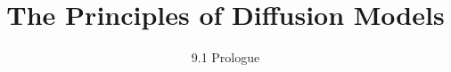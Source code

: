 ﻿%

\title{The Principles of Diffusion Models}
\subtitle{9.1 Prologue}


\begin{frame}
    \titlepage
\end{frame}


